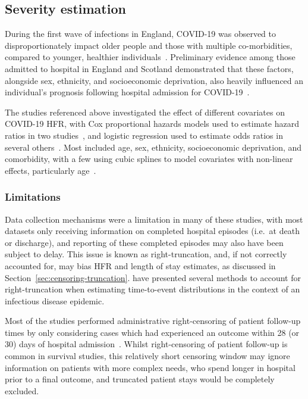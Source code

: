 \subsection{Severity estimation}

During the first wave of infections in England, COVID-19 was observed to disproportionately impact older people and those with multiple co-morbidities, compared to younger, healthier individuals~\parencite{Williamson2020-xk, Public_Health_England2020-xu}. Preliminary evidence among those admitted to hospital in England and Scotland demonstrated that these factors, alongside sex, ethnicity, and socioeconomic deprivation, also heavily influenced an individual's prognosis following hospital admission for COVID-19~\parencite{Ferrando-Vivas2021-ut, Docherty2021-es, Agrawal2021-ee, Gray2021-xk, Mathur2021-zf}.

The studies referenced above investigated the effect of different covariates on COVID-19 HFR, with Cox proportional hazards models used to estimate hazard ratios in two studies~\parencite{Ferrando-Vivas2021-ut, Mathur2021-zf}, and logistic regression used to estimate odds ratios in several others~\parencite{Agrawal2021-ee, Gray2021-xk, Docherty2021-es}. Most included age, sex, ethnicity, socioeconomic deprivation, and comorbidity, with a few using cubic splines to model covariates with non-linear effects, particularly age~\parencite{Mathur2021-zf, Gray2021-xk, Ferrando-Vivas2021-ut}.

\subsubsection{Limitations}

Data collection mechanisms were a limitation in many of these studies, with most datasets only receiving information on completed hospital episodes (i.e.\ at death or discharge), and reporting of these completed episodes may also have been subject to delay. This issue is known as right-truncation, and, if not correctly accounted for, may bias HFR and length of stay estimates, as discussed in Section~\ref{sec:censoring-truncation}. \cite{Seaman2022-wg} have presented several methods to account for right-truncation when estimating time-to-event distributions in the context of an infectious disease epidemic.

Most of the studies performed administrative right-censoring of patient follow-up times by only considering cases which had experienced an outcome within 28 (or 30) days of hospital admission~\parencite{Docherty2021-es, Agrawal2021-ee, Ferrando-Vivas2021-ut}. Whilst right-censoring of patient follow-up is common in survival studies, this relatively short censoring window may ignore information on patients with more complex needs, who spend longer in hospital prior to a final outcome, and truncated patient stays would be completely excluded.

